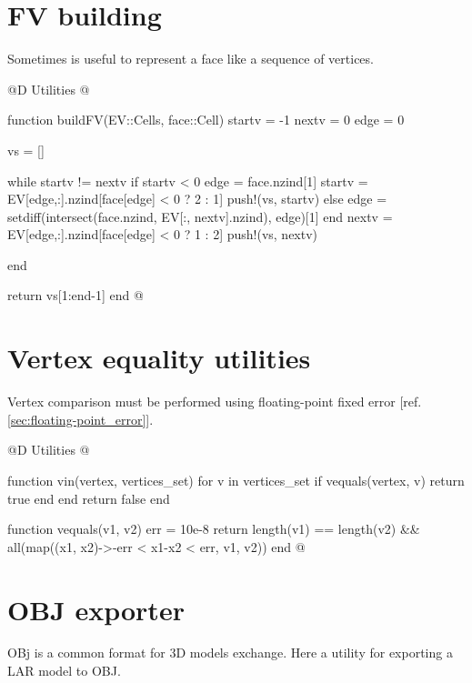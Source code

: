 \section{FV building}

Sometimes is useful to represent a face like a sequence of vertices.

@D Utilities
@{function buildFV(EV::Cells, face::Cell)
    startv = -1
    nextv = 0
    edge = 0

    vs = []

    while startv != nextv
        if startv < 0
            edge = face.nzind[1]
            startv = EV[edge,:].nzind[face[edge] < 0 ? 2 : 1]
            push!(vs, startv)
        else
            edge = setdiff(intersect(face.nzind, EV[:, nextv].nzind), edge)[1]
        end
        nextv = EV[edge,:].nzind[face[edge] < 0 ? 1 : 2]
        push!(vs, nextv)

    end

    return vs[1:end-1]
end
@}



\section{Vertex equality utilities}
\label{sec:vertex_equality}

Vertex comparison must be performed using 
floating-point fixed error 
[ref. \ref{sec:floating-point_error}].

@D Utilities
@{function vin(vertex, vertices_set)
    for v in vertices_set
        if vequals(vertex, v)
            return true
        end
    end
    return false
end

function vequals(v1, v2)
    err = 10e-8
    return length(v1) == length(v2) && all(map((x1, x2)->-err < x1-x2 < err, v1, v2))
end
@}

\section{OBJ exporter}

OBj is a common format for 3D models exchange. Here a utility for exporting
a LAR model to OBJ.


